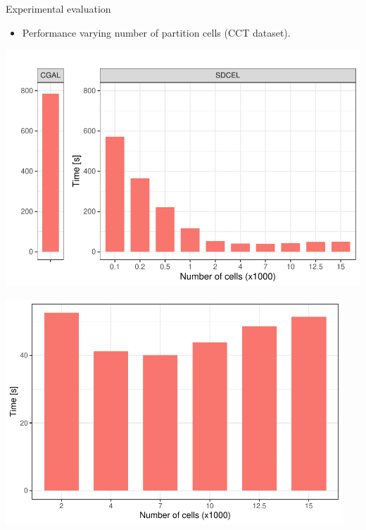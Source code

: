     \begin{frame}{Experimental evaluation}
        \begin{itemize}
            \item Performance varying number of partition cells (CCT dataset).
        \end{itemize}
        \vspace{1cm}

        \begin{minipage}{0.49\textwidth}
            \centering
            \includegraphics[width=\textwidth]{../thesis/chapterSDCEL/CA/CA}
        \end{minipage}\hfill %
        \begin{minipage}{0.49\textwidth}
            \centering
            \includegraphics[width=0.95\textwidth]{../thesis/chapterSDCEL/CA/CA_sample}
        \end{minipage}
    \end{frame}

